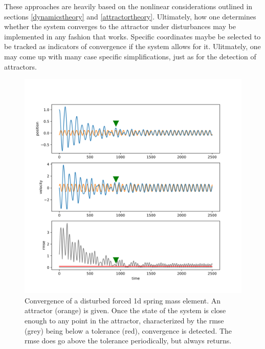  These approaches are heavily based on the nonlinear considerations outlined in sections \ref{dynamicstheory} and \ref{attractortheory}. Ultimately, how one determines whether the system converges to the attractor under disturbances may be implemented in any fashion that works. Specific coordinates maybe be selected to be tracked as indicators of convergence if the system allows for it. Ulitmately, one may come up with many case specific simplifications, just as for the detection of attractors. 

\begin{figure}[h]
\centering
\includegraphics[width=.7\textwidth]{figures/limit_cycle_convergence.png}
\caption[Convergence to Limit Cycle]{Convergence of a disturbed forced 1d spring mass element. An attractor (orange) is given. Once the state of the system is close enough to any point in the attractor, characterized by the rmse (grey) being below a tolerance (red), convergence is detected. The rmse does go above the tolerance periodically, but always returns. }
\label{lcconv}
\end{figure}



  


